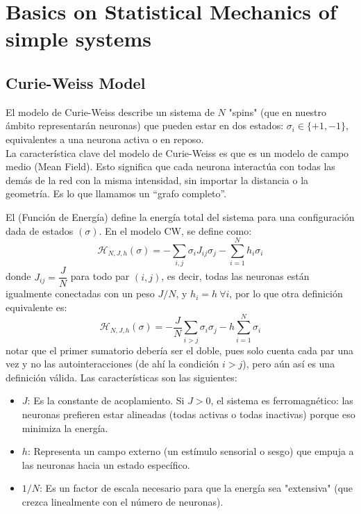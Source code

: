 \chapter{Basics on Statistical Mechanics of simple systems}

\section{Curie-Weiss Model}
\noindent
El modelo de Curie-Weiss describe un sistema de $N$ "spins" (que en nuestro ámbito representarán neuronas) que pueden estar en dos estados: $\sigma_i \in \{+1, -1\}$, equivalentes a una neurona activa o en reposo. \\

\noindent
La característica clave del modelo de Curie-Weiss es que es un modelo de campo medio (Mean Field). Esto significa que cada neurona interactúa con todas las demás de la red con la misma intensidad, sin importar la distancia o la geometría. Es lo que llamamos un ``grafo completo''. \\


\begin{definicion}
    El  (Función de Energía) define la energía total del sistema para una configuración dada de estados $(\sigma)$. En el modelo CW, se define como:
    $$ \mathcal{H}_{N,J,h}(\sigma) = - \sum_{i, j} \sigma_i J_{ij}\sigma_j - \sum_{i=1}^{N} h_i\sigma_i $$
    donde $J_{ij} = \dfrac{J}{N}$ para todo par $(i,j)$, es decir, todas las neuronas están igualmente conectadas con un peso $J/N$, y $h_i=h \ \forall i$, por lo que otra definición equivalente es:
    \begin{equation*}
        \mathcal{H}_{N,J,h}(\sigma) = - \frac{J}{N} \sum_{i > j} \sigma_i \sigma_j - h \sum_{i=1}^{N} \sigma_i
    \end{equation*}
    notar que el primer sumatorio debería ser el doble, pues solo cuenta cada par una vez  y no las autointeracciones (de ahí la condición $i>j$), pero aún así es una definición válida. Las características son las siguientes:
    \begin{itemize}
        \item $J$: Es la constante de acoplamiento. Si $J > 0$, el sistema es ferromagnético: las neuronas prefieren estar alineadas (todas activas o todas inactivas) porque eso minimiza la energía.
        \item $h$: Representa un campo externo (un estímulo sensorial o sesgo) que empuja a las neuronas hacia un estado específico.
        \item $1/N$: Es un factor de escala necesario para que la energía sea "extensiva" (que crezca linealmente con el número de neuronas).
    \end{itemize}
\end{definicion}

